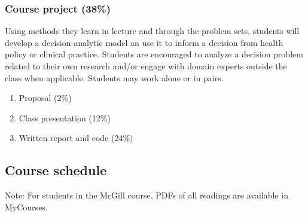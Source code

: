 \documentclass[
  letterpaper,
  DIV=11,
  numbers=noendperiod]{scrartcl}
\providecommand{\tightlist}{%
  \setlength{\itemsep}{0pt}\setlength{\parskip}{0pt}}\usepackage{longtable,booktabs,array}
\begin{document}
\hypertarget{course-project-38}{%
\subsubsection{Course project (38\%)}\label{course-project-38}}

Using methods they learn in lecture and through the problem sets,
students will develop a decision-analytic model an use it to inform a
decision from health policy or clinical practice. Students are
encouraged to analyze a decision problem related to their own research
and/or engage with domain experts outside the class when applicable.
Students may work alone or in pairs.

\begin{enumerate}
\def\labelenumi{\arabic{enumi}.}
\tightlist
\item
  Proposal (2\%)
\item
  Class presentation (12\%)
\item
  Written report and code (24\%)
\end{enumerate}

\hypertarget{course-schedule}{%
\subsection{Course schedule}\label{course-schedule}}

Note: For students in the McGill course, PDFs of all readings are
available in MyCourses.
\end{document}
